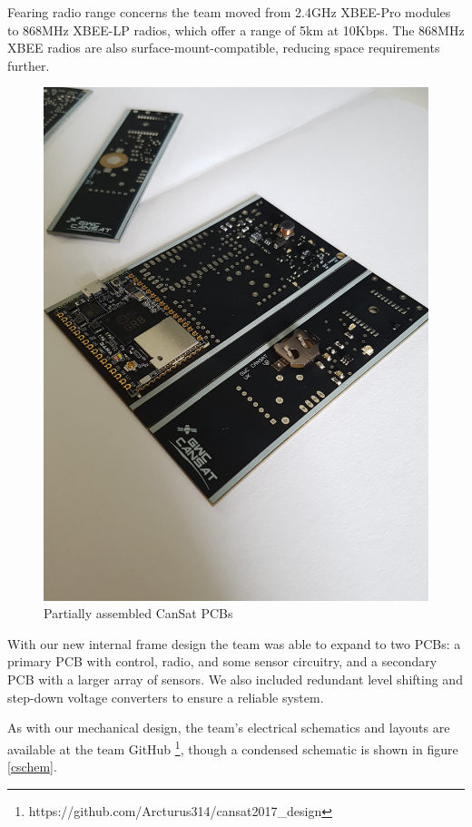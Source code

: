 \documentclass[]{report}
\begin{document}
		Fearing radio range concerns the team moved from 2.4GHz XBEE-Pro modules to 868MHz XBEE-LP radios, which offer a range of 5km at 10Kbps. The 868MHz XBEE radios are also surface-mount-compatible, reducing space requirements further.
		
		\begin{figure}[h]
			\hfill\includegraphics[scale=0.1, angle=270]{pcbs.jpg}\hspace*{\fill}
			\caption{Partially assembled CanSat PCBs}
			\label{pboardnew}
		\end{figure}
		
		With our new internal frame design the team was able to expand to two PCBs: a primary PCB with control, radio, and some sensor circuitry, and a secondary PCB with a larger array of sensors. We also included redundant level shifting and step-down voltage converters to ensure a reliable system.
		
		As with our mechanical design, the team's electrical schematics and layouts are available at the team GitHub \footnote{https://github.com/Arcturus314/cansat2017\_design}, though a condensed schematic is shown in figure \ref{cschem}.
		
\end{document}
